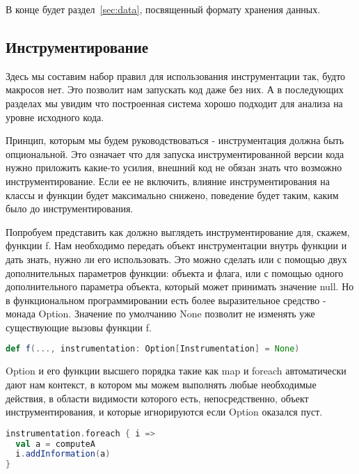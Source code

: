 В конце будет раздел~\ref{sec:data}, посвященный формату хранения данных.

\subsection{Инструментирование}
\label{sec:instrumentation}

Здесь мы составим набор правил для использования инструментации так,
будто макросов нет.
Это позволит нам запускать код даже без них.
А в последующих разделах мы увидим что построенная система хорошо подходит
для анализа на уровне исходного кода.

Принцип, которым мы будем руководствоваться - инструментация должна быть опциональной.
Это означает что для запуска инструментированной версии кода нужно приложить
какие-то усилия, внешний код не обязан знать что возможно инструментирование.
Если ее не включить, влияние инструментирования на классы и функции будет
максимально снижено, поведение будет таким, каким было до инструментирования.

Попробуем представить как должно выглядеть инструментирование для, скажем, функции f.
Нам необходимо передать объект инструментации внутрь функции и дать знать,
нужно ли его использовать.
Это можно сделать или с помощью двух дополнительных параметров функции:
объекта и флага, или с помощью одного дополнительного параметра объекта,
который может принимать значение null.
Но в функциональном программировании есть более выразительное средство -
монада Option.
Значение по умолчанию None позволит не изменять уже существующие вызовы функции f.

\begin{lstlisting}[language=scala,basicstyle=\ttfamily,keywordstyle=\color{red}]
def f(..., instrumentation: Option[Instrumentation] = None)
\end{lstlisting}

Option и его функции высшего порядка такие как map и foreach автоматически дают нам
контекст, в котором мы можем выполнять любые необходимые действия,
в области видимости которого есть, непосредственно, объект инструментирования,
и которые игнорируются если Option оказался пуст.

\begin{samepage}
\begin{lstlisting}[language=scala,basicstyle=\ttfamily,keywordstyle=\color{red}]
instrumentation.foreach { i =>
  val a = computeA
  i.addInformation(a)
}
\end{lstlisting}
\end{samepage}


